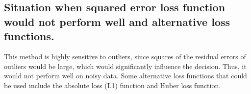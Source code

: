     \subsection{Situation when squared error loss function would not perform well and alternative loss functions.}
    This method is highly sensitive to outliers, since squares of the residual errors of outliers would be large, which would significantly influence the decision. Thus, it would not perform well on noisy data. Some alternative loss functions that could be used include the absolute loss (L1) function and Huber loss function. 
